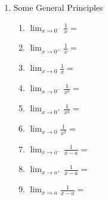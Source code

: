\documentclass[11pt,fleqn]{article}
\begin{document}
\begin{enumerate}
\item Some General Principles
	\begin{multicols}{3}
	\begin{enumerate}
	\item $\displaystyle{\lim_{x \to 0^-} \frac{1}{x} =}$
	\item $\displaystyle{\lim_{x \to 0^+} \frac{1}{x} =}$
	\item $\displaystyle{\lim_{x \to 0} \frac{1}{x} =}$
	\item $\displaystyle{\lim_{x \to 0^-} \frac{1}{x^2} =}$
	\item $\displaystyle{\lim_{x \to 0^+} \frac{1}{x^2} =}$
	\item $\displaystyle{\lim_{x \to 0} \frac{1}{x^2} =}$
	\item $\displaystyle{\lim_{x \to a^-} \frac{1}{x-a} =}$
	\item $\displaystyle{\lim_{x \to a^+} \frac{1}{x-a} =}$
	\item $\displaystyle{\lim_{x \to a} \frac{1}{x-a} =}$
	\end{enumerate}
	\end{multicols}
\end{enumerate}
\end{document}

